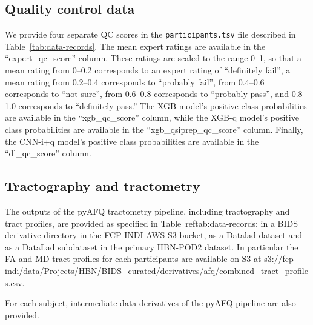 \documentclass[fleqn,10pt,inline]{wlscirep}
\begin{document}
\subsection*{Quality control data}

We provide four separate QC scores in the \texttt{participants.tsv} file described in Table~\ref{tab:data-records}. The mean expert ratings are available in the ``expert\_qc\_score'' column.
These ratings are scaled to the range \numrange{0}{1}, so that a mean rating from \numrange{0}{0.2} corresponds to an expert rating of ``definitely fail'', a mean rating from \numrange{0.2}{0.4} corresponds to ``probably fail'', from \numrange{0.4}{0.6} corresponds to ``not sure'', from \numrange{0.6}{0.8} corresponds to ``probably pass'', and \numrange{0.8}{1.0} corresponds to ``definitely pass.''
The XGB model's positive class probabilities are available in the ``xgb\_qc\_score'' column,
while the XGB-q model's positive class probabilities are available in the ``xgb\_qsiprep\_qc\_score'' column.
Finally, the CNN-i+q model's positive class probabilities are available in the ``dl\_qc\_score'' column.

\subsection*{Tractography and tractometry}

The outputs of the pyAFQ tractometry pipeline, including tractography and tract profiles, are provided as specified in Table~ref{tab:data-records}: in a BIDS derivative directory in the FCP-INDI AWS S3 bucket, as a Datalad dataset\cite{hbnpod2afqdata} and as a DataLad subdataset in the primary HBN-POD2 dataset\cite{hbnpod2data}. In particular the FA and MD tract profiles for each participants are available on S3 at \url{s3://fcp-indi/data/Projects/HBN/BIDS_curated/derivatives/afq/combined_tract_profiles.csv}.

For each subject, intermediate data derivatives of the pyAFQ pipeline are also provided. 
\end{document}

